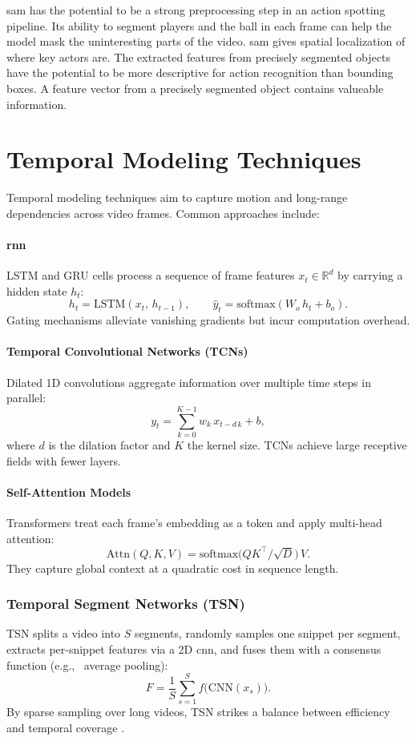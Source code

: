 \acrshort{sam} has the potential to be a strong preprocessing step in an action spotting pipeline. Its ability to segment players and the ball in each frame can help the model mask the uninteresting parts of the video. \acrshort{sam} gives spatial localization of where key actors are. The extracted features from precisely segmented objects have the potential to be more descriptive for action recognition than bounding boxes. A feature vector from a precisely segmented object contains valueable information. 




\section{Temporal Modeling Techniques}
\label{sec:temporal_models}

Temporal modeling techniques aim to capture motion and long-range dependencies across video frames. Common approaches include: 

\paragraph{\acrfull{rnn}}  
LSTM and GRU cells process a sequence of frame features \(x_t\in\mathbb{R}^d\) by carrying a hidden state \(h_t\):
\[
h_t = \mathrm{LSTM}(x_t,\,h_{t-1}), 
\qquad
\hat y_t = \mathrm{softmax}(W_o\,h_t + b_o).
\]
Gating mechanisms alleviate vanishing gradients but incur computation overhead.

\paragraph{Temporal Convolutional Networks (TCNs)}  
Dilated 1D convolutions aggregate information over multiple time steps in parallel:
\[
y_t = \sum_{k=0}^{K-1} w_k\,x_{t - d\,k} + b,
\]
where \(d\) is the dilation factor and \(K\) the kernel size. TCNs achieve large receptive fields with fewer layers.

\paragraph{Self-Attention Models}  
Transformers treat each frame's embedding as a token and apply multi-head attention:
\[
\mathrm{Attn}(Q,K,V) = \mathrm{softmax}\bigl(QK^\top/\sqrt{D}\bigr)\,V.
\]
They capture global context at a quadratic cost in sequence length.

\subsubsection{Temporal Segment Networks (TSN)}  
TSN splits a video into \(S\) segments, randomly samples one snippet per segment, extracts per-snippet features via a 2D \acrshort{cnn}, and fuses them with a consensus function (e.g., \ average pooling):
\[
F = \frac{1}{S}\sum_{s=1}^{S}f\bigl(\mathrm{CNN}(x_s)\bigr).
\]
By sparse sampling over long videos, TSN strikes a balance between efficiency and temporal coverage \cite{wang_tsn_2017}.

